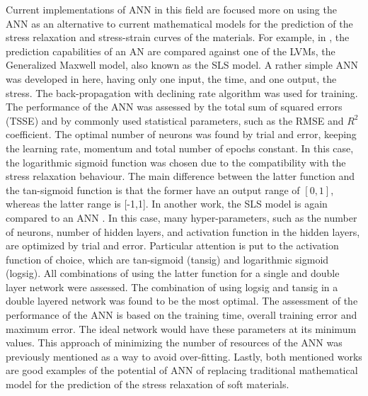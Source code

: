 Current implementations of ANN in this field are focused more on using the ANN as an alternative to current mathematical models for the prediction of the stress relaxation and stress-strain curves of the materials. For example, in \cite{saeidirad2013predictions} , the prediction capabilities of an AN are compared against one of the LVMs, the Generalized Maxwell model, also known as the SLS model. A rather simple ANN was developed in here, having only one input, the time, and one output, the stress. The back-propagation with declining rate algorithm was used for training. The performance of the ANN was assessed by the total sum of squared errors (TSSE) and by commonly used statistical parameters, such as the RMSE and $R^2$ coefficient. The optimal number of neurons was found by trial and error, keeping the learning rate, momentum and total number of epochs constant. In this case, the logarithmic sigmoid function was chosen due to the compatibility with the stress relaxation behaviour. The main difference between the latter function and the tan-sigmoid function is that the former have an output range of $[0,1]$, whereas the latter range is [-1,1]. In another work, the SLS model is again compared to an ANN \cite{gao2015viscoelastic}. In this case, many hyper-parameters, such as the number of neurons, number of hidden layers, and activation function in the hidden layers, are optimized by trial and error. Particular attention is put to the activation function of choice, which are tan-sigmoid (tansig) and logarithmic sigmoid (logsig). All combinations of using the latter function for a single and double layer network were assessed. The combination of using logsig and tansig in a double layered network was found to be the most optimal. The assessment of the performance of the ANN is based on the training time, overall training error and maximum error. The ideal network would have these parameters at its minimum values. This approach of minimizing the number of resources of the ANN was previously mentioned as a way to avoid over-fitting. Lastly, both mentioned works are good examples of the potential of ANN of replacing traditional mathematical model for the prediction of the stress relaxation of soft materials.

